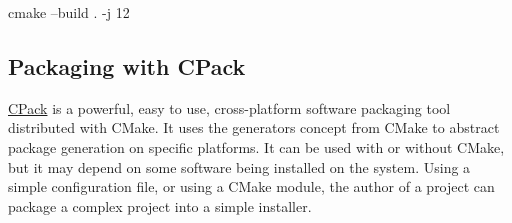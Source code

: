 \begin{script}
 cmake --build . -j 12
\end{script}

\subsection{Packaging with CPack}

\href{https://cmake.org/cmake/help/book/mastering-cmake/chapter/Packaging\%20With\%20CPack.html}{CPack} is a powerful, easy to use, 
cross-platform software packaging tool distributed with CMake. 
It uses the generators concept from CMake to abstract package generation on specific platforms. 
It can be used with or without CMake, but it may depend on some software being installed on the system. 
Using a simple configuration file, or using a CMake module, the author of a project can package a complex project into a simple installer. 
